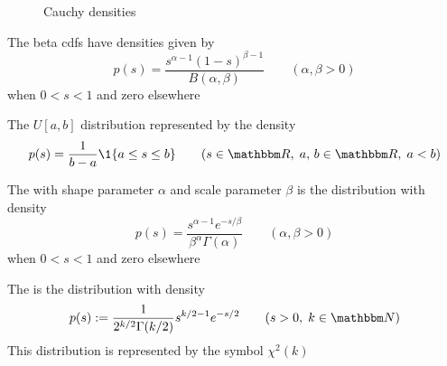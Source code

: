 \begin{frame}

    \begin{figure}
   \begin{center}
    \caption{\label{f:cauchy_densities} Cauchy densities}
   \end{center}
    \end{figure}
    
\end{frame}

\begin{frame}

    \vspace{2em}
    \Eg
    The beta {\sc cdf}s  have densities given by 
    \begin{equation*}
        p(s) = \frac{s^{\alpha-1} (1-s)^{\beta-1}}{B(\alpha, \beta)}
            \qquad (\alpha, \beta > 0)
    \end{equation*}
    when $0 < s < 1$ and zero elsewhere

\end{frame}


\begin{frame}

    \vspace{2em}
    \Eg
    The $U[a, b]$ distribution represented
    by the density
    \begin{equation*}
        p(s) = \frac{1}{b - a} \1\{a \leq s \leq b\}
        \qquad (s \in \RR, \; a, \, b \in \RR, \; a < b)
    \end{equation*}
    
\end{frame}


\begin{frame}

    \vspace{2em}
    \Eg
    The  with shape parameter $\alpha$ and scale
    parameter $\beta$ is the distribution with density
    \begin{equation*}
        p(s) = 
        \frac{s^{\alpha-1} e^{-s/\beta}}{\beta^{\alpha} \Gamma(\alpha)} 
            \qquad (\alpha, \beta > 0)
    \end{equation*}
    when $0 < s < 1$ and zero elsewhere
    
\end{frame}


\begin{frame}

    \vspace{2em}
    \Eg
    The 
    is the distribution with density
    \begin{equation*}
        p(s) := \frac{1}{2^{k/2} \Gamma(k/2)} s^{k/2 - 1} e^{-s/2} 
        \qquad (s > 0,\; k \in \NN)
    \end{equation*}
    This distribution is represented by the symbol $\chi^2(k)$
    
\end{frame}


